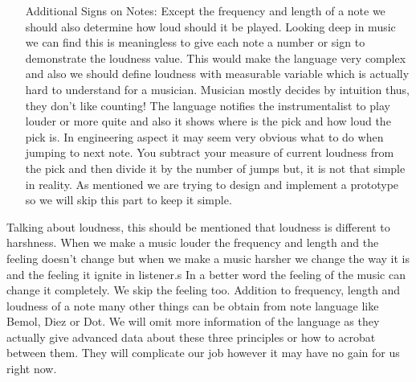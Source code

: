 \begin{itemize}
\item[Additional Signs on Notes: ]{Except the frequency and length of a note we should also determine how loud should it be played. Looking deep in music we can find this is meaningless to give each note a number or sign to demonstrate the loudness value. This would make the language very complex and also we should define loudness with measurable variable which is actually hard to understand for a musician. Musician mostly decides by intuition thus, they don't like counting! The language notifies the instrumentalist to play louder or more quite and also it shows where is the pick and how loud the pick is. In engineering aspect it may seem very obvious what to do when jumping to next note. You subtract your measure of current loudness from the pick and then divide it by the number of jumps but, it is not that simple in reality. As mentioned we are trying to design and implement a prototype so we will skip this part to keep it simple. }
\end{itemize} 
Talking about loudness, this should be mentioned that loudness is different to harshness. When we make a music louder the frequency and length and the feeling doesn't change but when we make a music harsher we change the way it is and the feeling it ignite in listener.s In a better word the feeling of the music can change it completely. We skip the feeling too.\newline
Addition to frequency, length and loudness of a note many other things can be obtain from note language like Bemol, Diez or Dot. We will omit more information of the language as they actually give advanced data about these three principles or how to acrobat between them. They will complicate our job however it may have no gain for us right now.


